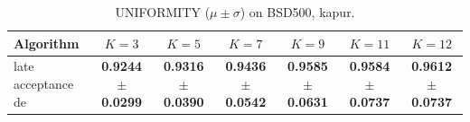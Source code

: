 \begin{table}[htbp]
\centering
\caption{UNIFORMITY ($\mu \pm \sigma$) on BSD500, kapur.}
\label{tab:exp1-kapur-uniformity}
\begin{tabular}{lcccccc}
\toprule
Algorithm & $K=3$ & $K=5$ & $K=7$ & $K=9$ & $K=11$ & $K=12$ \\
\midrule
late acceptance de & \textbf{0.9244 $\pm$ 0.0299} & \textbf{0.9316 $\pm$ 0.0390} & \textbf{0.9436 $\pm$ 0.0542} & \textbf{0.9585 $\pm$ 0.0631} & \textbf{0.9584 $\pm$ 0.0737} & \textbf{0.9612 $\pm$ 0.0737} \\
\bottomrule
\end{tabular}
\end{table}